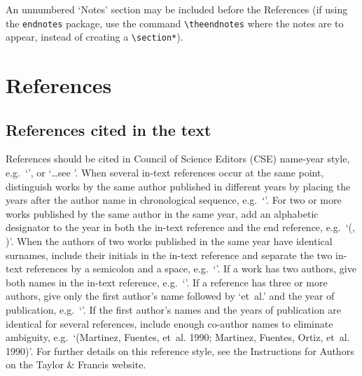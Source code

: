 \documentclass[]{interact}
\theoremstyle{plain}%
\theoremstyle{definition}
\theoremstyle{remark}
\begin{document}
An unnumbered `Notes' section may be included before the References (if using the \verb"endnotes" package, use the command \verb"\theendnotes" where the notes are to appear, instead of creating a \verb"\section*").


\section{References}

\subsection{References cited in the text}

References should be cited in Council of Science Editors (CSE) name-year style, e.g.\ `\citep{Rit74,Fel81,Fau02}', or `\ldots see \citet[p.~15]{Smi91}'. When several in-text references occur at the same point, distinguish works by the same author published in different years by placing the years after the author name in chronological sequence, e.g.\ `\citep{Smi70,Smi75}'. For two or more works published by the same author in the same year, add an alphabetic designator to the year in both the in-text reference and the end reference, e.g.\ `(\citealp{And60CJPS}, \citeyear{And60CJB})'. When the authors of two works published in the same year have identical surnames, include their initials in the in-text reference and separate the two in-text references by a semicolon and a space, e.g.\ `\citep{DawJ86,DawM86}'. If a work has two authors, give both names in the in-text reference, e.g.\ `\citep{Wei74}'. If a reference has three or more authors, give only the first author's name followed by `et~al.' and the year of publication, e.g.\ `\citep{Och03}'. If the first author's names and the years of publication are identical for several references, include enough co-author names to eliminate ambiguity, e.g.\ `(Martinez, Fuentes, et~al. 1990; Martinez, Fuentes, Ortiz, et~al. 1990)'. For further details on this reference style, see the Instructions for Authors on the Taylor \& Francis website.
\end{document}
